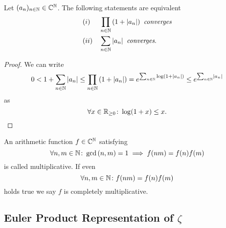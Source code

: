 \begin{lemma}
	Let $(a_n)_{n \in \mathbb{N}} \in \mathbb{C}^{\mathbb{N}}$. The following statements are equivalent
\begin{equation*}
\begin{aligned}
	&(i) &&\prod_{n \in \mathbb{N}} \left(1 + \left|a_n\right|\right) \textit{ converges} \\
	&(ii) &&\sum_{n \in \mathbb{N}} \left|a_n\right| \textit{ converges}.
\end{aligned}
\end{equation*}
\end{lemma}
\begin{proof}
	We can write
\begin{equation*}
	0 < 1 + \sum_{n \in \mathbb{N}} \left|a_n\right| \leq \prod_{n \in \mathbb{N}} \left(1 + \left|a_n\right|\right) = e^{\sum_{n \in \mathbb{N}} \log(1 + \left|a_n\right|)} \leq e^{\sum_{n \in \mathbb{N}} \left|a_n\right|}
\end{equation*}
	as
\begin{equation*}
	\forall x \in \mathbb{R}_{\geq 0} \colon \log(1 + x) \leq x.
\end{equation*}
\end{proof}


\begin{definition}
	An arithmetic function $f \in \mathbb{C}^{\mathbb{N}}$ satisfying
\begin{equation*}
	\forall n,m \in \mathbb{N} \colon \gcd\left(n, m\right) = 1 \implies f(n m) = f(n) f(m)
\end{equation*}
	is called multiplicative. If even
\begin{equation*}
	\forall n,m \in \mathbb{N} \colon f(n m) = f(n) f(m)
\end{equation*}
	holds true we say $f$ is completely multiplicative.
\end{definition}


\subsection{Euler Product Representation of $\zeta$}


